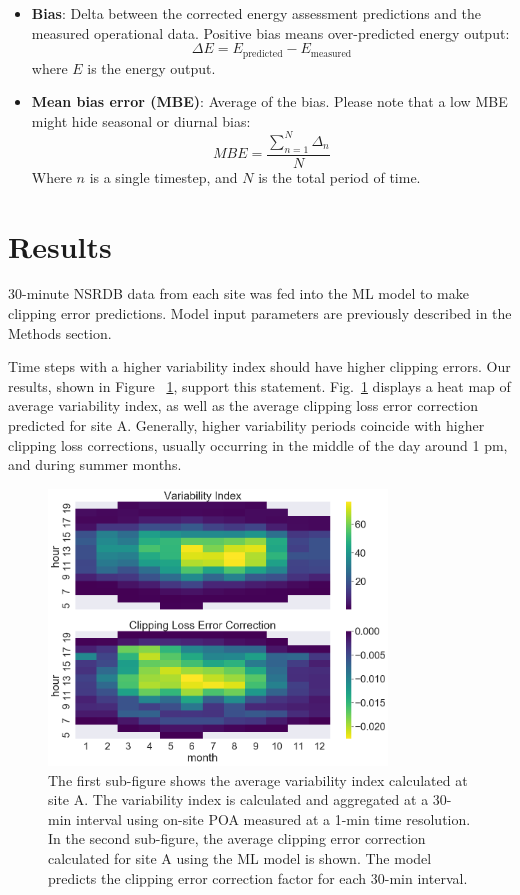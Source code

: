 \documentclass[conference]{IEEEtran}
\begin{document}
\begin{itemize}
\item \textbf{Bias}: Delta between the corrected energy assessment predictions and the measured operational data. Positive bias means over-predicted energy output:
\begin{equation}
\Delta E={E_\text{predicted}} - {E_\text{measured}}\label{eq:bias}
\end{equation}
where $E$ is the energy output.
\item \textbf{Mean bias error (MBE)}: Average of the bias. Please note that a low MBE might hide seasonal or diurnal bias:
\begin{equation}
\mathit{MBE}=\frac{\sum_{n=1}^N{\Delta_n}}{N}\label{eq:mbe}
\end{equation}
Where $n$ is a single timestep, and $N$ is the total period of time. 
\end{itemize}


\section{Results}

30-minute NSRDB data from each site was fed into the ML model to make clipping error predictions. Model input parameters are previously described in the Methods section.

Time steps with a higher variability index should have higher clipping errors. Our results, shown in Figure ~\ref{fig:DCS-vi-clec-heatmap}, support this statement. Fig.~\ref{fig:DCS-vi-clec-heatmap} displays a heat map of average variability index, as well as the average clipping loss error correction predicted for site A. Generally, higher variability periods coincide with higher clipping loss corrections, usually occurring in the middle of the day around 1 pm, and during summer months.

\begin{figure}[htbp]
\centerline{\includegraphics[width=9cm]{DCS_VI_CLEC_heatmap.png}}
\caption{The first sub-figure shows the average variability index calculated at site A. The variability index is calculated and aggregated at a 30-min interval using on-site POA measured at a 1-min time resolution. In the second sub-figure, the average clipping error correction calculated for site A using the ML model is shown. The model predicts the clipping error correction factor for each 30-min interval.}
\label{fig:DCS-vi-clec-heatmap}
\end{figure}
\end{document}
